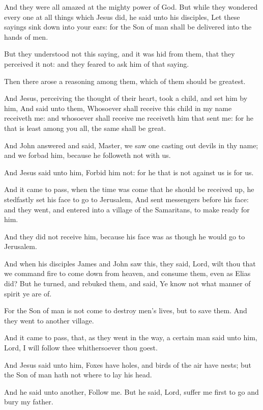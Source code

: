 \Verse And they were all amazed at the mighty power of God. But while they wondered every one at all things which Jesus did, he said unto his disciples, \Verse Let these sayings sink down into your ears: for the Son of man shall be delivered into the hands of men.

\Verse But they understood not this saying, and it was hid from them, that they perceived it not: and they feared to ask him of that saying.

\Verse Then there arose a reasoning among them, which of them should be greatest.

\Verse And Jesus, perceiving the thought of their heart, took a child, and set him by him, \Verse And said unto them, Whosoever shall receive this child in my name receiveth me: and whosoever shall receive me receiveth him that sent me: for he that is least among you all, the same shall be great.

\Verse And John answered and said, Master, we saw one casting out devils in thy name; and we forbad him, because he followeth not with us.

\Verse And Jesus said unto him, Forbid him not: for he that is not against us is for us.

\Verse And it came to pass, when the time was come that he should be received up, he stedfastly set his face to go to Jerusalem, \Verse And sent messengers before his face: and they went, and entered into a village of the Samaritans, to make ready for him.

\Verse And they did not receive him, because his face was as though he would go to Jerusalem.

\Verse And when his disciples James and John saw this, they said, Lord, wilt thou that we command fire to come down from heaven, and consume them, even as Elias did?  \Verse But he turned, and rebuked them, and said, Ye know not what manner of spirit ye are of.

\Verse For the Son of man is not come to destroy men's lives, but to save them. And they went to another village.

\Verse And it came to pass, that, as they went in the way, a certain man said unto him, Lord, I will follow thee whithersoever thou goest.

\Verse And Jesus said unto him, Foxes have holes, and birds of the air have nests; but the Son of man hath not where to lay his head.

\Verse And he said unto another, Follow me. But he said, Lord, suffer me first to go and bury my father.


